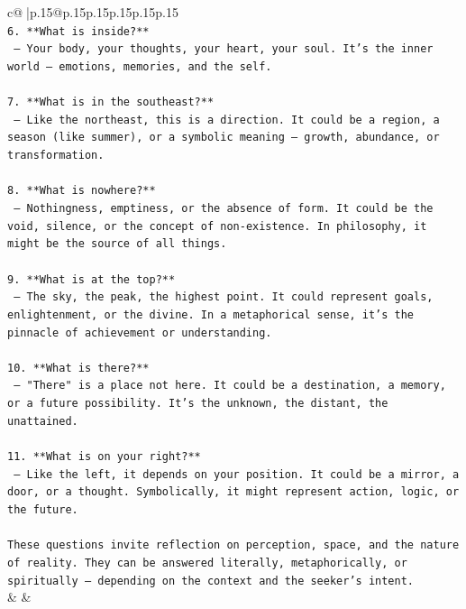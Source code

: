 \documentclass{article}
\begin{document}
{\begin{supertabular}{c@{$\;$}|p{.15\linewidth}@{}p{.15\linewidth}p{.15\linewidth}p{.15\linewidth}p{.15\linewidth}p{.15\linewidth}}
{{{\\ 
\texttt{6. **What is inside?**  } \\
\texttt{   — Your body, your thoughts, your heart, your soul. It’s the inner world — emotions, memories, and the self.} \\
\\ 
\texttt{7. **What is in the southeast?**  } \\
\texttt{   — Like the northeast, this is a direction. It could be a region, a season (like summer), or a symbolic meaning — growth, abundance, or transformation.} \\
\\ 
\texttt{8. **What is nowhere?**  } \\
\texttt{   — Nothingness, emptiness, or the absence of form. It could be the void, silence, or the concept of non{-}existence. In philosophy, it might be the source of all things.} \\
\\ 
\texttt{9. **What is at the top?**  } \\
\texttt{   — The sky, the peak, the highest point. It could represent goals, enlightenment, or the divine. In a metaphorical sense, it’s the pinnacle of achievement or understanding.} \\
\\ 
\texttt{10. **What is there?**  } \\
\texttt{   — "There" is a place not here. It could be a destination, a memory, or a future possibility. It’s the unknown, the distant, the unattained.} \\
\\ 
\texttt{11. **What is on your right?**  } \\
\texttt{   — Like the left, it depends on your position. It could be a mirror, a door, or a thought. Symbolically, it might represent action, logic, or the future.} \\
\\ 
\texttt{These questions invite reflection on perception, space, and the nature of reality. They can be answered literally, metaphorically, or spiritually — depending on the context and the seeker’s intent.} \\
            }
        }
    }
    & & \\ \\


\end{supertabular}}
\end{document}
